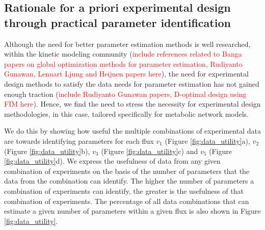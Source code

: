 \documentclass[10pt]{article}
\begin{document}
	
	\subsection{Rationale for a priori experimental design through practical parameter identification}\label{sec:data_utility}
	Although the need for better parameter estimation methods is well researched, within the kinetic modeling community (\textcolor{red}{include references related to Banga papers on global optimization methods for parameter estimation, Rudiyanto Gunawan, Lennart Ljung and Heijnen papers here}), the need for experimental design methods to satisfy the data needs for parameter estimation has not gained enough traction (\textcolor{red}{include Rudiyanto Gunawan papers, D-optimal design using FIM here}). Hence, we find the need to stress the necessity for experimental design methodologies, in this case, tailored specifically for metabolic network models. 	
	
	We do this by showing how useful the multiple combinations of experimental data are towards identifying parameters for each flux $v_1$ (Figure \ref{fig:data_utility}a), $v_2$ (Figure \ref{fig:data_utility}b), $v_3$ (Figure \ref{fig:data_utility}c) and $v_5$ (Figure \ref{fig:data_utility}d). We express the usefulness of data from any given combination of experiments on the basis of the number of parameters that the data from the combination can identify. The higher the number of parameters a combination of experiments can identify, the greater is the usefulness of that combination of experiments. The percentage of all data combinations that can estimate a given number of parameters within a given flux is also shown in Figure \ref{fig:data_utility}.
	
\end{document}
